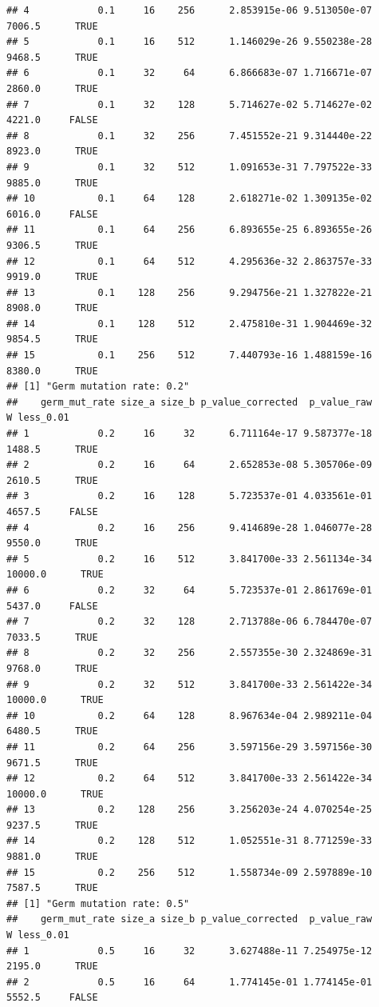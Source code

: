 \documentclass[]{book}
\begin{document}
\begin{verbatim}
## 4            0.1     16    256      2.853915e-06 9.513050e-07 7006.5      TRUE
## 5            0.1     16    512      1.146029e-26 9.550238e-28 9468.5      TRUE
## 6            0.1     32     64      6.866683e-07 1.716671e-07 2860.0      TRUE
## 7            0.1     32    128      5.714627e-02 5.714627e-02 4221.0     FALSE
## 8            0.1     32    256      7.451552e-21 9.314440e-22 8923.0      TRUE
## 9            0.1     32    512      1.091653e-31 7.797522e-33 9885.0      TRUE
## 10           0.1     64    128      2.618271e-02 1.309135e-02 6016.0     FALSE
## 11           0.1     64    256      6.893655e-25 6.893655e-26 9306.5      TRUE
## 12           0.1     64    512      4.295636e-32 2.863757e-33 9919.0      TRUE
## 13           0.1    128    256      9.294756e-21 1.327822e-21 8908.0      TRUE
## 14           0.1    128    512      2.475810e-31 1.904469e-32 9854.5      TRUE
## 15           0.1    256    512      7.440793e-16 1.488159e-16 8380.0      TRUE
## [1] "Germ mutation rate: 0.2"
##    germ_mut_rate size_a size_b p_value_corrected  p_value_raw       W less_0.01
## 1            0.2     16     32      6.711164e-17 9.587377e-18  1488.5      TRUE
## 2            0.2     16     64      2.652853e-08 5.305706e-09  2610.5      TRUE
## 3            0.2     16    128      5.723537e-01 4.033561e-01  4657.5     FALSE
## 4            0.2     16    256      9.414689e-28 1.046077e-28  9550.0      TRUE
## 5            0.2     16    512      3.841700e-33 2.561134e-34 10000.0      TRUE
## 6            0.2     32     64      5.723537e-01 2.861769e-01  5437.0     FALSE
## 7            0.2     32    128      2.713788e-06 6.784470e-07  7033.5      TRUE
## 8            0.2     32    256      2.557355e-30 2.324869e-31  9768.0      TRUE
## 9            0.2     32    512      3.841700e-33 2.561422e-34 10000.0      TRUE
## 10           0.2     64    128      8.967634e-04 2.989211e-04  6480.5      TRUE
## 11           0.2     64    256      3.597156e-29 3.597156e-30  9671.5      TRUE
## 12           0.2     64    512      3.841700e-33 2.561422e-34 10000.0      TRUE
## 13           0.2    128    256      3.256203e-24 4.070254e-25  9237.5      TRUE
## 14           0.2    128    512      1.052551e-31 8.771259e-33  9881.0      TRUE
## 15           0.2    256    512      1.558734e-09 2.597889e-10  7587.5      TRUE
## [1] "Germ mutation rate: 0.5"
##    germ_mut_rate size_a size_b p_value_corrected  p_value_raw       W less_0.01
## 1            0.5     16     32      3.627488e-11 7.254975e-12  2195.0      TRUE
## 2            0.5     16     64      1.774145e-01 1.774145e-01  5552.5     FALSE

\end{verbatim}
\end{document}

